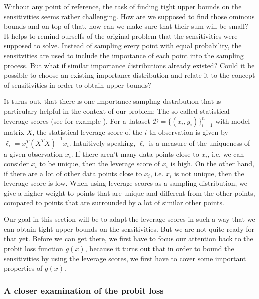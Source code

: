 Without any point of reference, the task of finding tight upper bounds
on the sensitivities seems rather challenging.
How are we supposed to find those ominous bounds and on top of that,
how can we make sure that their sum will be small?
It helps to remind ourselfs of the original problem that the sensitivities
were supposed to solve. Instead of sampling every point with equal
probability, the sensitvities are used to include the importance
of each point into the sampling process.
But what if similar importance distributions already existed?
Could it be possible to choose an existing importance distribution
and relate it to the concept of sensitivities in order to
obtain upper bounds?

It turns out, that there is one importance sampling
distribution that is particulary helpful in the context of our problem:
The so-called statistical leverage scores (see for example
\cite{leverage-scores-drineas}).
For a dataset $\mathcal{D} = \{(x_i, y_i)\}_{i=1}^n$ with model
matrix $X$, the statistical leverage score of the $i$-th observation is
given by $\ell_i = x_i^T(X^TX)^{-1}x_i$.
Intuitively speaking, $\ell_i$ is a measure of the uniqueness of a given
observation $x_i$. If there aren't many
data points close to $x_i$, i.e. we can consider $x_i$ to be
unique, then the leverage score of $x_i$
is high. On the other hand, if there are a lot of other data points
close to $x_i$, i.e. $x_i$ is not unique, then the leverage score
is low. When using leverage scores as a sampling distribution, we
give a higher weight to points that are unique and different from
the other points, compared to points that are surrounded by a lot
of similar other points.

Our goal in this section will be to adapt the leverage scores in
such a way that we can obtain tight upper bounds on the sensitivities.
But we are not quite ready for that yet.
Before we can get there, we first have to focus our attention back
to the probit loss function $g(x)$, because it turns out that in order
to bound the sensitivities by using the leverage scores, we first
have to cover some important properties of $g(x)$.

\subsubsection{A closer examination of the probit loss}


